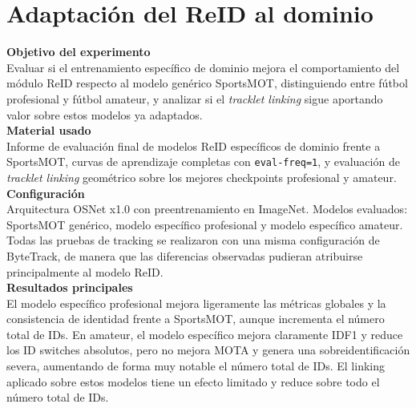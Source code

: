 \documentclass[../MAIN.tex]{subfiles}
\begin{document}
	
	
	\section{Adaptación del ReID al dominio}
	
	
	\begin{chaptertemplatebox}
		\textbf{Objetivo del experimento}\\
		Evaluar si el entrenamiento específico de dominio mejora el comportamiento del módulo ReID respecto al modelo genérico SportsMOT, distinguiendo entre fútbol profesional y fútbol amateur, y analizar si el \textit{tracklet linking} sigue aportando valor sobre estos modelos ya adaptados.\\[0.5em]
		
		\textbf{Material usado}\\
		Informe de evaluación final de modelos ReID específicos de dominio frente a SportsMOT, curvas de aprendizaje completas con \texttt{eval-freq=1}, y evaluación de \textit{tracklet linking} geométrico sobre los mejores checkpoints profesional y amateur.\\[0.5em]
		
		\textbf{Configuración}\\
		Arquitectura OSNet x1.0 con preentrenamiento en ImageNet. Modelos evaluados: SportsMOT genérico, modelo específico profesional y modelo específico amateur. Todas las pruebas de tracking se realizaron con una misma configuración de ByteTrack, de manera que las diferencias observadas pudieran atribuirse principalmente al modelo ReID.\\[0.5em]
		
		\textbf{Resultados principales}\\
		El modelo específico profesional mejora ligeramente las métricas globales y la consistencia de identidad frente a SportsMOT, aunque incrementa el número total de IDs. En amateur, el modelo específico mejora claramente IDF1 y reduce los ID switches absolutos, pero no mejora MOTA y genera una sobreidentificación severa, aumentando de forma muy notable el número total de IDs. El linking aplicado sobre estos modelos tiene un efecto limitado y reduce sobre todo el número total de IDs.\\[0.5em]
		

\end{chaptertemplatebox}
\end{document}
